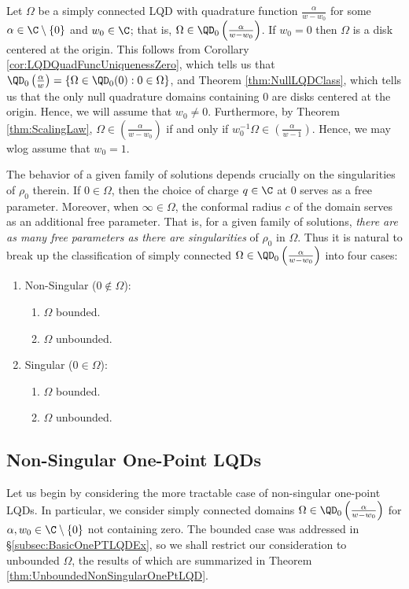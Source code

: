 \documentclass{article}
\numberwithin{equation}{section}
\begin{document}
Let $\Omega$ be a simply connected LQD with quadrature function $\frac{\alpha}{w-w_0}$ for some $\alpha\in\C\setminus\{0\}$ and $w_0\in\C$; that is, $\Omega\in\QD_0\left(\frac{\alpha}{w-w_0}\right)$. If $w_0=0$ then $\Omega$ is a disk centered at the origin. This follows from Corollary \ref{cor:LQDQuadFuncUniquenessZero}, which tells us that $\QD_0\left(\frac{\alpha}{w}\right)=\left\{\Omega\in\QD_0(0):0\in\Omega\right\}$, and Theorem \ref{thm:NullLQDClass}, which tells us that the only null quadrature domains containing $0$ are disks centered at the origin. Hence, we will assume that $w_0\neq0$. Furthermore, by Theorem \ref{thm:ScalingLaw}, $\Omega\in\left(\frac{\alpha}{w-w_0}\right)$ if and only if $w_0^{-1}\Omega\in\left(\frac{\alpha}{w-1}\right)$. Hence, we may wlog assume that $w_0=1$.

The behavior of a given family of solutions depends crucially on the singularities of $\rho_0$ therein. If $0\in\Omega$, then the choice of charge $q\in\C$ at $0$ serves as a free parameter. Moreover, when $\infty\in\Omega$, the conformal radius $c$ of the domain serves as an additional free parameter. That is, for a given family of solutions, {\it there are as many free parameters as there are singularities} of $\rho_0$ in $\Omega$. Thus it is natural to break up the classification of simply connected $\Omega\in\QD_0\left(\frac{\alpha}{w-w_0}\right)$ into four cases:
\begin{enumerate}
    \item Non-Singular ($0\notin\Omega$):
    \begin{enumerate}
        \item $\Omega$ bounded.
        \item $\Omega$ unbounded.
    \end{enumerate}
    \item Singular ($0\in\Omega$):
    \begin{enumerate}
        \item $\Omega$ bounded.
        \item $\Omega$ unbounded.
    \end{enumerate}
\end{enumerate}



\subsection{Non-Singular One-Point LQDs}\label{subsec:LOGWQDOnePtNZ}
Let us begin by considering the more tractable case of non-singular one-point LQDs. In particular, we consider simply connected domains $\Omega\in\QD_0\left(\frac{\alpha}{w-w_0}\right)$ for $\alpha,w_0\in\C\setminus\{0\}$ not containing zero. The bounded case was addressed in \S\ref{subsec:BasicOnePTLQDEx}, so we shall restrict our consideration to unbounded $\Omega$, the results of which are summarized in Theorem \ref{thm:UnboundedNonSingularOnePtLQD}.
\end{document}
